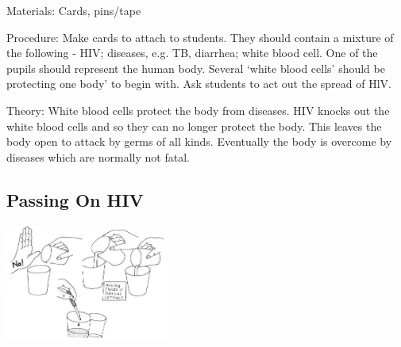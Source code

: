\begin{multicols}{2}
\begin{description*}
\item[Materials:]{Cards, pins/tape}
\item[Procedure:]{Make cards to attach to students. They should contain a mixture of the
following - HIV; diseases, e.g. TB, diarrhea; white blood cell. One of
the pupils should represent the human body. Several `white blood cells'
should be protecting one body' to begin with. Ask students to act out
the spread of HlV.}
\item[Theory:]{White blood cells protect the
body from diseases. HIV knocks
out the white blood cells and so
they can no longer protect the
body. This leaves the body open
to attack by germs of all kinds.
Eventually the body is overcome
by diseases which are normally
not fatal.}
\end{description*}

\subsection{Passing On HIV}

\begin{center}
\includegraphics[width=0.4\textwidth]{./img/vso/hiv-passing.jpg}
\end{center}


\end{multicols}
